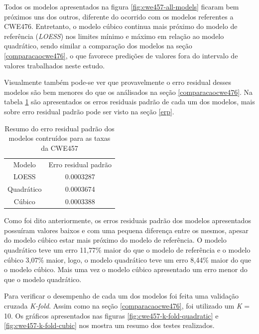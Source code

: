 Todos os modelos apresentados na figura \ref{fig:cwe457-all-models} ficaram bem
próximos uns dos outros, diferente do ocorrido com os modelos referentes a
CWE476. Entretanto, o modelo cúbico continua mais próximo do modelo de
referência (\textit{LOESS}) nos limites mínimo e máximo em relação ao modelo
quadrático, sendo similar a comparação dos modelos na seção
\ref{comparacaocwe476}, o que favorece predições de valores fora do intervalo de
valores trabalhados neste estudo.

Visualmente também pode-se ver que provavelmente o erro residual desses modelos
são bem menores do que os análisados na seção \ref{comparacaocwe476}. Na tabela
\ref{tab:cwe457-erros} são apresentados os erros residuais padrão de cada um dos
modelos, mais sobre erro residual padrão pode ser visto na seção \ref{erp}.

\begin{table}[h]
 \centering
 \begin{tabular}{cc}
  \rowcolor[HTML]{EFEFEF} 
  {Modelo} & {Erro residual padrão} \\
  {LOESS}  & 0.0003287                  \\
  Quadrático   & 0.0003674                  \\
  Cúbico       & 0.0003388                 
 \end{tabular}
 \caption{Resumo do erro residual padrão dos modelos contruídos para as taxas da
 CWE457}
 \label{tab:cwe457-erros}
\end{table}

Como foi dito anteriormente, os erros residuais padrão dos modelos apresentados
possuíram valores baixos e com uma pequena diferença entre os mesmos, apesar do
modelo cúbico estar mais próximo do modelo de referência. O modelo quadrático
teve um erro 11,77\% maior do que o modelo de referência e o modelo cúbico
3,07\% maior, logo, o modelo quadrático teve um erro 8,44\% maior do que o
modelo cúbico. Mais uma vez o modelo cúbico apresentado um erro menor do que o
modelo quadrático.

Para verificar o desempenho de cada um dos modelos foi feita uma validação
cruzada \textit{K-fold}. Assim como na seção \ref{comparacaocwe476}, foi
utilizado um \textit{K} = 10. Os gráficos apresentados nas figuras
\ref{fig:cwe457-k-fold-quadratic} e \ref{fig:cwe457-k-fold-cubic} nos mostra um
resumo dos testes realizados.

